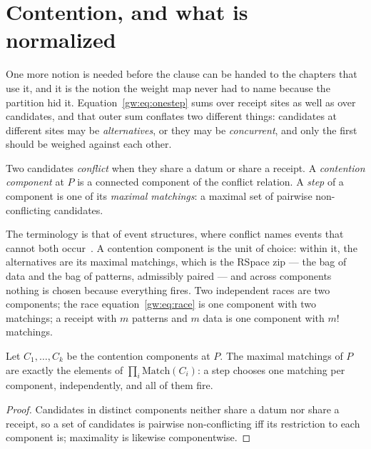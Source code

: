 \section{Contention, and what is normalized}
\label{gw:sec:contention}

One more notion is needed before the clause can be handed to the chapters that use it,
and it is the notion the weight map never had to name because the partition hid it.
Equation~\eqref{gw:eq:onestep} sums over receipt sites as well as over candidates, and
that outer sum conflates two different things: candidates at different sites may be
\emph{alternatives}, or they may be \emph{concurrent}, and only the first should be
weighed against each other.

\begin{definition}
\label{gw:def:contention}
Two candidates \emph{conflict} when they share a datum or share a receipt. A
\emph{contention component} at $P$ is a connected component of the conflict relation. A
\emph{step} of a component is one of its \emph{maximal matchings}: a maximal set of
pairwise non-conflicting candidates.
\end{definition}

The terminology is that of event structures, where conflict names events that cannot both
occur~\cite{Winskel}. A contention component is the unit of choice: within it, the
alternatives are its maximal matchings, which is the RSpace zip --- the bag of data and
the bag of patterns, admissibly paired --- and across components nothing is chosen
because everything fires. Two independent races are two components; the race
equation~\eqref{gw:eq:race} is one component with two matchings; a receipt with $m$
patterns and $m$ data is one component with $m!$ matchings.

\begin{proposition}
\label{gw:prop:eventfact}
Let $C_1,\dots,C_k$ be the contention components at $P$. The maximal matchings of $P$
are exactly the elements of $\prod_i \mathrm{Match}(C_i)$: a step chooses one matching
per component, independently, and all of them fire.
\end{proposition}

\begin{proof}
Candidates in distinct components neither share a datum nor share a receipt, so a set of
candidates is pairwise non-conflicting iff its restriction to each component is;
maximality is likewise componentwise.
\end{proof}

